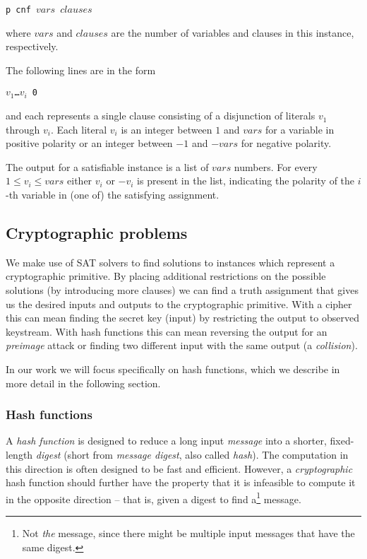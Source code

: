 \centerline{\texttt{p cnf $vars$ $clauses$}}

\noindent where $vars$ and $clauses$ are the number of variables and clauses in this instance, respectively.

The following lines are in the form

\centerline{\texttt{$v_1$\dots$v_i$ 0}}

\noindent and each represents a single clause consisting of a disjunction of literals $v_1$ through $v_i$.
Each literal $v_i$ is an integer between $1$ and $vars$ for a variable in positive polarity or an integer between $-1$ and $-vars$ for negative polarity.

The output for a satisfiable instance is a list of $vars$ numbers.
For every $1 \le v_i \le vars$ either $v_i$ or $-v_i$ is present in the list, indicating the polarity of the $i$-th variable in (one of) the satisfying assignment. 

\subsection{Cryptographic problems}
We make use of SAT solvers to find solutions to instances which represent a cryptographic primitive.
By placing additional restrictions on the possible solutions (by introducing more clauses) we can find a truth assignment that gives us the desired inputs and outputs to the cryptographic primitive.
With a cipher this can mean finding the secret key (input) by restricting the output to observed keystream.
With hash functions this can mean reversing the output for an \emph{preimage} attack or finding two different input with the same output (a \emph{collision}).

In our work we will focus specifically on hash functions, which we describe in more detail in the following section.

\subsubsection{Hash functions}
A \emph{hash function} is designed to reduce a long input \emph{message} into a shorter, fixed-length \emph{digest} (short from \emph{message digest}, also called \emph{hash}).
The computation in this direction is often designed to be fast and efficient.
However, a \emph{cryptographic} hash function should further have the property that it is infeasible to compute it in the opposite direction -- that is, given a digest to find a\footnote{Not \emph{the} message, since there might be multiple input messages that have the same digest.} message.

